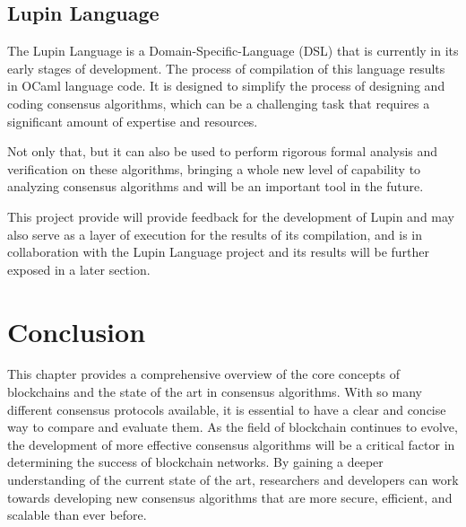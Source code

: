 \subsection*{\textbf{Lupin Language}}
\label{lupin}

The Lupin Language is a Domain-Specific-Language (DSL) that is currently in its early stages of development. 
The process of compilation of this language results in OCaml language code.
It is designed to simplify the process of designing and coding consensus algorithms, which can be a challenging task that requires a significant amount of expertise and resources.

Not only that, but it can also be used to perform rigorous formal analysis and verification on these algorithms, bringing 
a whole new level of capability to analyzing consensus algorithms and will be an important tool in the future.

This project provide will provide feedback for the development of Lupin and may also serve as a layer of execution for the results of its compilation, and is in collaboration with the Lupin Language project and its results will be further exposed in a later section.



\section{Conclusion}
This chapter provides a comprehensive overview of the core concepts of blockchains and the state of the art in consensus algorithms. With so many different consensus protocols available, it is essential to have a clear and concise way to compare and evaluate them. As the field of blockchain continues to evolve, the development of more effective consensus algorithms will be a critical factor in determining the success of blockchain networks. By gaining a deeper understanding of the current state of the art, researchers and developers can work towards developing new consensus algorithms that are more secure, efficient, and scalable than ever before.
